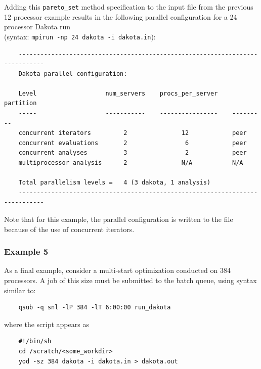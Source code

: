 Adding this \texttt{pareto\_set} method specification to the input file from 
the previous 12 processor example results in the following parallel configuration
for a 24 processor Dakota run \\
(syntax: \texttt{mpirun -np 24 dakota -i dakota.in}):
\begin{small}
\begin{verbatim}
    -----------------------------------------------------------------------------
    Dakota parallel configuration:

    Level                   num_servers    procs_per_server    partition
    -----                   -----------    ----------------    ---------
    concurrent iterators         2               12            peer
    concurrent evaluations       2                6            peer
    concurrent analyses          3                2            peer
    multiprocessor analysis      2               N/A           N/A

    Total parallelism levels =   4 (3 dakota, 1 analysis)
    -----------------------------------------------------------------------------
\end{verbatim}
\end{small}

Note that for this example, the parallel configuration is written to the
file  because of the use of concurrent iterators.

\subsubsection{Example 5}\label{parallel:spec:multi:example5}

As a final example, consider a multi-start optimization conducted on
384 processors. A job of this size must be submitted to
the batch queue, using syntax similar to:
\begin{small}
\begin{verbatim}
    qsub -q snl -lP 384 -lT 6:00:00 run_dakota
\end{verbatim}
\end{small}

where the  script appears as
\begin{small}
\begin{verbatim}
    #!/bin/sh
    cd /scratch/<some_workdir>
    yod -sz 384 dakota -i dakota.in > dakota.out
\end{verbatim}
\end{small}

